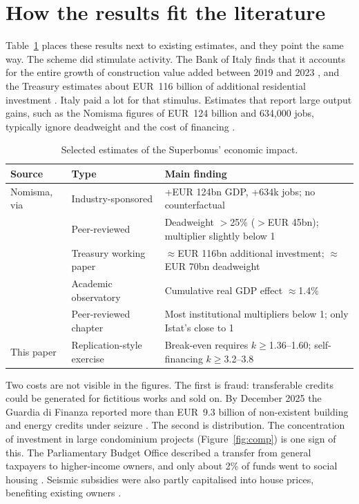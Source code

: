 \documentclass[11pt,a4paper]{article}
\begin{document}
\section{How the results fit the literature}
Table~\ref{tab:lit} places these results next to existing estimates, and they point the same way. The scheme did stimulate activity. The Bank of Italy finds that it accounts for the entire growth of construction value added between 2019 and 2023 \citep{accetturo2026}, and the Treasury estimates about EUR~116 billion of additional residential investment \citep{mef_wp}. Italy paid a lot for that stimulus. Estimates that report large output gains, such as the Nomisma figures of EUR~124 billion and 634,000 jobs, typically ignore deadweight and the cost of financing \citep{codogno2024}.

\begin{table}[H]\centering\small
\caption{Selected estimates of the Superbonus' economic impact.}\label{tab:lit}
\begin{tabular}{p{4.1cm}p{3.4cm}p{6.3cm}}
\toprule
Source & Type & Main finding \\
\midrule
Nomisma, via \citet{codogno2024} & Industry-sponsored & +EUR 124bn GDP, +634k jobs; no counterfactual \\
\citet{accetturo2026} & Peer-reviewed & Deadweight $>$25\% ($>$EUR 45bn); multiplier slightly below 1 \\
\citet{mef_wp} & Treasury working paper & $\approx$EUR 116bn additional investment; $\approx$EUR 70bn deadweight \\
\citet{ocpi2023} & Academic observatory & Cumulative real GDP effect $\approx$1.4\% \\
\citet{capone2026} & Peer-reviewed chapter & Most institutional multipliers below 1; only Istat's close to 1 \\
This paper & Replication-style exercise & Break-even requires $k\ge$1.36--1.60; self-financing $k\ge$3.2--3.8 \\
\bottomrule
\end{tabular}
\end{table}

Two costs are not visible in the figures. The first is fraud: transferable credits could be generated for fictitious works and sold on. By December 2025 the Guardia di Finanza reported more than EUR~9.3 billion of non-existent building and energy credits under seizure \citep{sky2025}. The second is distribution. The concentration of investment in large condominium projects (Figure~\ref{fig:comp}) is one sign of this. The Parliamentary Budget Office described a transfer from general taxpayers to higher-income owners, and only about 2\% of funds went to social housing \citep{capone2026}. Seismic subsidies were also partly capitalised into house prices, benefiting existing owners \citep{crispino2025}.
\end{document}
